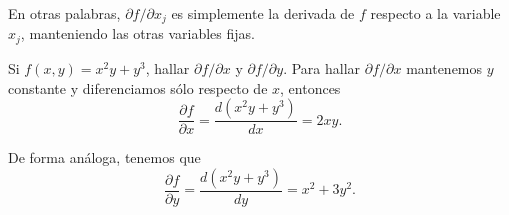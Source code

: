 En otras palabras, $\partial f / \partial x_{j}$ es simplemente la derivada de $f$ respecto a la variable $x_{j}$, manteniendo las otras variables fijas.

\begin{myExample}
    Si $f(x,y) = x^{2}y+y^{3}$, hallar $\partial f / \partial x$ y $\partial f / \partial y$.
    Para hallar $\partial f / \partial x$ mantenemos $y$ constante y diferenciamos sólo respecto de $x$, entonces
    $$ \frac{\partial f}{\partial x} = \frac{d(x^{2}y+y^{3})}{dx} = 2xy \text{.} $$

    De forma análoga, tenemos que
    $$ \frac{\partial f}{\partial y} = \frac{d(x^{2}y+y^{3})}{dy} = x^{2} + 3y^{2} \text{.} $$
\end{myExample}
